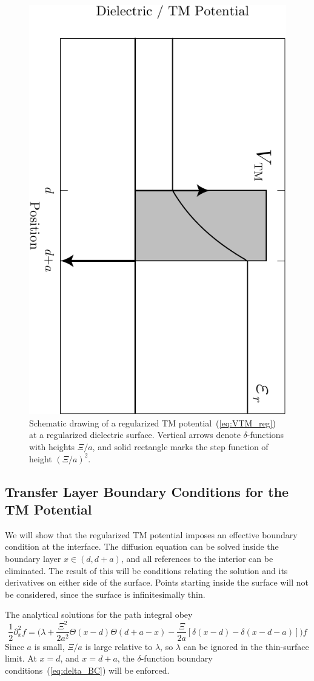 \begin{figure}
  \centering
  \includegraphics[width=0.4\linewidth,angle=90]{fig/analytical/TMpot}
  \caption[Regularized TM Potential]{Schematic drawing of a regularized TM potential~(\ref{eq:VTM_reg})
    at a regularized dielectric surface.  
    Vertical arrows denote $\delta$-functions with heights $\Xi/a$, and solid rectangle marks the 
    step function of height $(\Xi/a)^2$.  }
  \label{fig:TMpot}
\end{figure}


\subsection{Transfer Layer Boundary Conditions for the TM Potential}

We will show that the regularized TM potential imposes an effective boundary condition at the interface. 
The diffusion equation can be solved inside the boundary layer $x\in(d,d+a)$, and all references 
to the interior can be eliminated.  The result of this will be conditions relating
the solution and its derivatives on either side of the surface.
Points starting inside the surface will not be considered, since the surface is infinitesimally thin.

The analytical solutions for the path integral obey
\begin{equation}
  \frac{1}{2}\partial_x^2f =\bigg(\lambda+\frac{\Xi^2}{2a^2}\Theta(x-d)\Theta(d+a-x)
  - \frac{\Xi}{2a}[\delta(x-d)-\delta(x-d-a)]\bigg)f
\end{equation}
Since $a$ is small, $\Xi/a$ is large relative to $\lambda$, so $\lambda$ can be ignored in the thin-surface limit.    
At $x=d$, and $x=d+a$, the $\delta$-function boundary conditions~(\ref{eq:delta_BC}) will be enforced.

